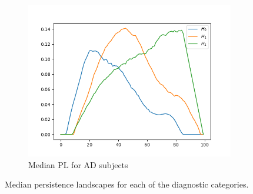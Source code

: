 \documentclass{article}
\begin{document}
\begin{figure}
\begin{subfigure}{0.32\textwidth}
    \includegraphics[width=\textwidth]{figures/median_pls/median_pl_AD.png}
    \caption{Median PL for AD subjects}
  \end{subfigure}
  \caption{Median persistence landscapes for each of the diagnostic categories.}
  \label{fig:median_pls}
\end{figure}
\end{document}

